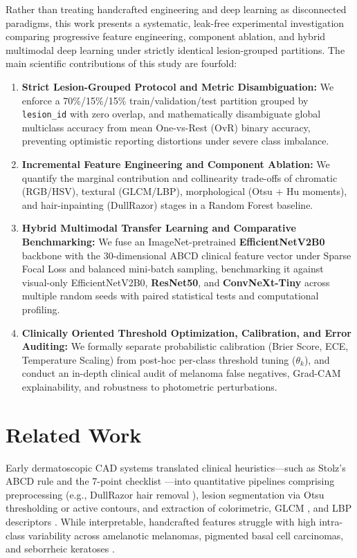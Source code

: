 \documentclass[11pt,a4paper]{article}
\begin{document}
Rather than treating handcrafted engineering and deep learning as disconnected paradigms, this work presents a systematic, leak-free experimental investigation comparing progressive feature engineering, component ablation, and hybrid multimodal deep learning under strictly identical lesion-grouped partitions. The main scientific contributions of this study are fourfold:
\begin{enumerate}
    \item \textbf{Strict Lesion-Grouped Protocol and Metric Disambiguation:} We enforce a 70\%/15\%/15\% train/validation/test partition grouped by \texttt{lesion\_id} with zero overlap, and mathematically disambiguate global multiclass accuracy from mean One-vs-Rest (OvR) binary accuracy, preventing optimistic reporting distortions under severe class imbalance.
    \item \textbf{Incremental Feature Engineering and Component Ablation:} We quantify the marginal contribution and collinearity trade-offs of chromatic (RGB/HSV), textural (GLCM/LBP), morphological (Otsu + Hu moments), and hair-inpainting (DullRazor) stages in a Random Forest baseline.
    \item \textbf{Hybrid Multimodal Transfer Learning and Comparative Benchmarking:} We fuse an ImageNet-pretrained \textbf{EfficientNetV2B0} backbone with the 30-dimensional ABCD clinical feature vector under Sparse Focal Loss and balanced mini-batch sampling, benchmarking it against visual-only EfficientNetV2B0, \textbf{ResNet50}, and \textbf{ConvNeXt-Tiny} across multiple random seeds with paired statistical tests and computational profiling.
    \item \textbf{Clinically Oriented Threshold Optimization, Calibration, and Error Auditing:} We formally separate probabilistic calibration (Brier Score, ECE, Temperature Scaling) from post-hoc per-class threshold tuning ($\theta_k$), and conduct an in-depth clinical audit of melanoma false negatives, Grad-CAM explainability, and robustness to photometric perturbations.
\end{enumerate}

\section{Related Work}
Early dermatoscopic CAD systems translated clinical heuristics---such as Stolz's ABCD rule \cite{nachbar1994} and the 7-point checklist \cite{argenziano1998}---into quantitative pipelines comprising preprocessing (e.g., DullRazor hair removal \cite{lee1997}), lesion segmentation via Otsu thresholding \cite{otsu1979} or active contours, and extraction of colorimetric, GLCM \cite{haralick1973}, and LBP \cite{ojala2002} descriptors \cite{celebi2007, barata2014}. While interpretable, handcrafted features struggle with high intra-class variability across amelanotic melanomas, pigmented basal cell carcinomas, and seborrheic keratoses \cite{barata2018}.
\end{document}
